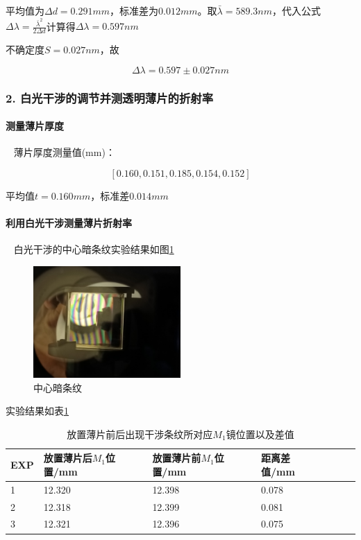 \documentclass[12pt,a4paper,UTF8]{ctexart}
\begin{document}
		平均值为$\Delta d = 0.291 mm$，标准差为$0.012mm$。取$\bar\lambda = 589.3nm$，代入公式$\Delta \lambda = \frac{\bar\lambda^2}{2\Delta d}$计算得$\Delta \lambda = 0.597nm$

		不确定度$S = 0.027nm$，故

		$$
		\Delta \lambda = 0.597 \pm 0.027 nm
		$$

	\subsubsection*{2. 白光干涉的调节并测透明薄片的折射率}

		\paragraph{测量薄片厚度}~
		\newline
		\indent
		薄片厚度测量值(mm)：
		
		$$
		[0.160,0.151,0.185,0.154,0.152]
		$$

		平均值$t = 0.160mm$，标准差$0.014mm$

		\paragraph{利用白光干涉测量薄片折射率}~
		\newline
		\indent
		白光干涉的中心暗条纹实验结果如图\ref{fig:illus-2}
		\begin{figure}[htbp]
			\centering
			\includegraphics[width=0.5\textwidth]{attachments/illus-2.jpg}
			\caption{中心暗条纹}
			\label{fig:illus-2}
		\end{figure}

		实验结果如表\ref{tab:1}
		\begin{table}[htbp]
			\centering
			\begin{tabular}{|l|l|l|l|l|l|l|}
			\hline
			EXP & 放置薄片后$M_1$位置/mm & 放置薄片前$M_1$位置/mm & 距离差值/mm \\ \hline
			1 & 12.320 & 12.398 & 0.078 \\ \hline
			2 & 12.318 & 12.399 & 0.081 \\ \hline
			3 & 12.321 & 12.396 & 0.075 \\ \hline
			\end{tabular}
			\caption{放置薄片前后出现干涉条纹所对应$M_1$镜位置以及差值}
			\label{tab:1}
		\end{table}
\end{document}
